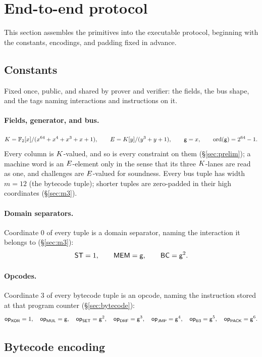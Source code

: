 \section{End-to-end protocol}\label{sec:e2e}

This section assembles the primitives into the executable protocol, beginning with the constants, encodings, and padding fixed in advance.

\subsection{Constants}\label{sec:e2e-const}

Fixed once, public, and shared by prover and verifier: the fields, the bus shape, and the tags naming interactions and instructions on it.

\paragraph{Fields, generator, and bus.}
\[
K=\mathbb{F}_2[x]/(x^{64}+x^4+x^3+x+1),\qquad
E=K[y]/(y^3+y+1),\qquad
\mathsf{g}=x,\qquad \operatorname{ord}(\mathsf{g})=2^{64}-1.
\]
Every column is $K$-valued, and so is every constraint on them (\S\ref{sec:prelim}); a machine word is an $E$-element only in the sense that its three $K$-lanes are read as one, and challenges are $E$-valued for soundness. Every bus tuple has width $m=12$ (the bytecode tuple); shorter tuples are zero-padded in their high coordinates (\S\ref{sec:m3}).

\paragraph{Domain separators.} Coordinate $0$ of every tuple is a domain separator, naming the interaction it belongs to (\S\ref{sec:m3}):
\[
  \mathsf{ST}=1,\qquad \mathsf{MEM}=\mathsf{g},\qquad \mathsf{BC}=\mathsf{g}^{2}.
\]

\paragraph{Opcodes.} Coordinate $3$ of every bytecode tuple is an opcode, naming the instruction stored at that program counter (\S\ref{sec:bytecode}):
\[
  \mathsf{op}_{\mathsf{XOR}}=1,\quad \mathsf{op}_{\mathsf{MUL}}=\mathsf{g},\quad \mathsf{op}_{\mathsf{SET}}=\mathsf{g}^{2},\quad \mathsf{op}_{\mathsf{DRF}}=\mathsf{g}^{3},\quad \mathsf{op}_{\mathsf{JMP}}=\mathsf{g}^{4},\quad \mathsf{op}_{\mathsf{B3}}=\mathsf{g}^{5},\quad \mathsf{op}_{\mathsf{PACK}}=\mathsf{g}^{6}.
\]

\subsection{Bytecode encoding}\label{sec:e2e-bc}

